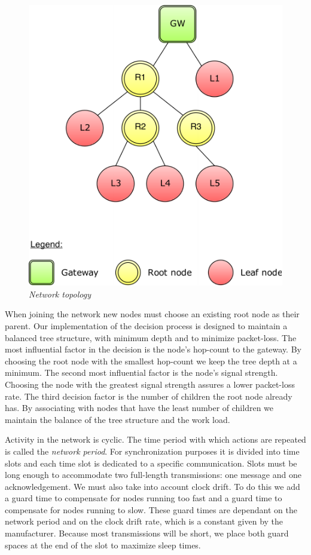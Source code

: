 \begin{figure}[ht]
	\begin{center}
		\includegraphics{img/network_topology.pdf}
	\end{center}
	\caption{\small \itshape{Network topology}}
	\label{img:network_topology}
\end{figure}

When joining the network new nodes must choose an existing root node as their
parent. Our implementation of the decision process is designed to maintain a balanced
tree structure, with minimum depth and to minimize packet-loss. The
most influential factor in the decision is the node's hop-count to the gateway.
By choosing the root node with the smallest hop-count we keep the tree depth at
a minimum. The second most influential factor is the node's signal strength.
Choosing the node with the greatest signal strength assures a lower
packet-loss rate. The third decision factor is the number of children the root
node already has. By associating with nodes that have the least number of
children we maintain the balance of the tree structure and the work load.

Activity in the network is cyclic. The time period with which actions are
repeated is called the \emph{network period}. For synchronization purposes it
is divided into time slots and each time slot is dedicated to a specific
communication. Slots must be long enough to accommodate two full-length
transmissions: one message and one acknowledgement. We must also take into
account clock drift. To do this we add a guard time to compensate for nodes
running too fast and a guard time to compensate for nodes running to slow.
These guard times are dependant on the network period and on the clock drift
rate, which is a constant given by the manufacturer. Because most transmissions
will be short, we place both guard spaces at the end of the slot to maximize
sleep times.

